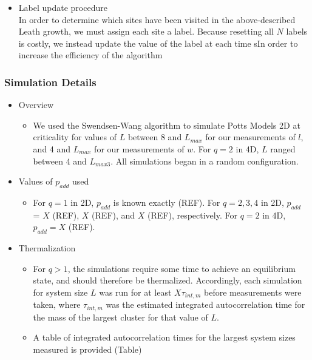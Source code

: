 \documentclass[11pt]{article}
\begin{document}
\begin{itemize}
\item Label update procedure\\
\label{sec-5-2-4-8}%
In order to determine which sites have been visited in the above-described Leath growth, we must assign each site a label.  Because resetting all $N$ labels is costly, we instead update the value of the label at each time sIn order to increase the efficiency of the algorithm
\end{itemize} %
\subsubsection{Simulation Details}
\label{sec-5-2-5}
\begin{itemize}

\item Overview
\label{sec-5-2-5-1}%
\begin{itemize}

\item We used the Swendsen-Wang algorithm to simulate Potts Models 2D at criticality for values of $L$ between 8 and $L_{max}$ for our  measurements of $l$, and 4 and $L_{max}$ for our measurements of $w$.  For $q=2$ in 4D, $L$ ranged between 4 and $L_{max3}$.  All simulations began in a random configuration.\\
\label{sec-5-2-5-1-1}%
\end{itemize} %

\item Values of $p_{add}$ used
\label{sec-5-2-5-2}%
\begin{itemize}

\item For $q=1$ in 2D, $p_{add}$ is known exactly (REF).  For $q=2,3,4$ in 2D, $p_{add}$ = $X$ (REF), $X$ (REF), and $X$ (REF), respectively. For $q=2$ in 4D, $p_{add}=X$ (REF).\\
\label{sec-5-2-5-2-1}%
\end{itemize} %

\item Thermalization
\label{sec-5-2-5-3}%
\begin{itemize}

\item For $q>1$, the simulations require some time to achieve an equilibrium state, and should therefore be thermalized. Accordingly, each simulation for system size $L$ was run for at least $X \tau_{int,m}$ before measurements were taken, where $\tau_{int,m}$ was the estimated integrated autocorrelation time for the mass of the largest cluster for that value of $L$.\\
\label{sec-5-2-5-3-1}%
\item A table of integrated autocorrelation times for the largest system sizes measured is provided (Table)\\
\label{sec-5-2-5-3-2}%
\end{itemize} %


\end{itemize}
\end{document}
